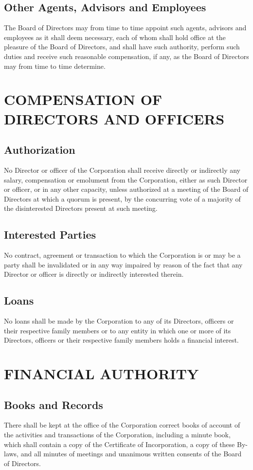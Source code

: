 \documentclass{article}
\begin{document}
\subsection{Other Agents, Advisors and Employees}
The Board of Directors may from time to time appoint such agents, advisors and employees as it shall deem necessary, each of whom shall hold office at the pleasure of the Board of Directors, and shall have such authority, perform such duties and receive such reasonable compensation, if any, as the Board of Directors may from time to time determine.
\section{COMPENSATION OF DIRECTORS AND OFFICERS}
\subsection{Authorization}
No Director or officer of the Corporation shall receive directly or indirectly any salary, compensation or emolument from the Corporation, either as such Director or officer, or in any other capacity, unless authorized at a meeting of the Board of Directors at which a quorum is present, by the concurring vote of a majority of the disinterested Directors present at such meeting.
\subsection{Interested Parties}
No contract, agreement or transaction to which the Corporation is or may be a party shall be invalidated or in any way impaired by reason of the fact that any Director or officer is directly or indirectly interested therein.
\subsection{Loans}
No loans shall be made by the Corporation to any of its Directors, officers or their respective family members or to any entity in which one or more of its Directors, officers or their respective family members holds a financial interest.
\section{FINANCIAL AUTHORITY}
\subsection{Books and Records}
There shall be kept at the office of the Corporation correct books of account of the activities and transactions of the Corporation, including a minute book, which shall contain a copy of the Certificate of Incorporation, a copy of these By-laws, and all minutes of meetings and unanimous written consents of the Board of Directors.
\end{document}
